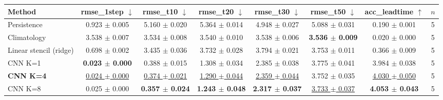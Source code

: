 \begin{tabular}{lccccccc}
\toprule
Method & rmse\_1step $\downarrow$ & rmse\_t10 $\downarrow$ & rmse\_t20 $\downarrow$ & rmse\_t30 $\downarrow$ & rmse\_t50 $\downarrow$ & acc\_leadtime $\uparrow$ & $n$ \\
\midrule
Persistence & 0.923 $\pm$ 0.005 & 5.160 $\pm$ 0.020 & 5.364 $\pm$ 0.014 & 4.948 $\pm$ 0.027 & 5.088 $\pm$ 0.031 & 0.190 $\pm$ 0.001 & 5 \\
Climatology & 3.538 $\pm$ 0.007 & 3.534 $\pm$ 0.008 & 3.540 $\pm$ 0.010 & 3.538 $\pm$ 0.006 & \textbf{3.536 $\pm$ 0.009} & 0.020 $\pm$ 0.000 & 5 \\
Linear stencil (ridge) & 0.698 $\pm$ 0.002 & 3.435 $\pm$ 0.036 & 3.732 $\pm$ 0.028 & 3.794 $\pm$ 0.021 & 3.753 $\pm$ 0.011 & 0.366 $\pm$ 0.009 & 5 \\
CNN K=1 & \textbf{0.023 $\pm$ 0.000} & 0.388 $\pm$ 0.015 & 1.308 $\pm$ 0.034 & 2.385 $\pm$ 0.038 & 3.775 $\pm$ 0.041 & 3.984 $\pm$ 0.038 & 5 \\
\textbf{CNN K=4} & \underline{0.024 $\pm$ 0.000} & \underline{0.374 $\pm$ 0.021} & \underline{1.290 $\pm$ 0.044} & \underline{2.359 $\pm$ 0.044} & 3.752 $\pm$ 0.035 & \underline{4.030 $\pm$ 0.050} & 5 \\
CNN K=8 & 0.025 $\pm$ 0.000 & \textbf{0.357 $\pm$ 0.024} & \textbf{1.243 $\pm$ 0.048} & \textbf{2.317 $\pm$ 0.037} & \underline{3.733 $\pm$ 0.037} & \textbf{4.053 $\pm$ 0.043} & 5 \\
\bottomrule
\end{tabular}
